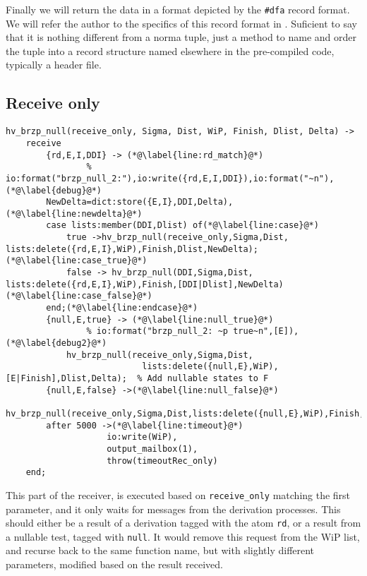 Finally we will return the data in a format depicted by the
\texttt{\#dfa} record format. We will refer the author to the specifics
of this record format in \cite{joe:09}. Suficient to say that it is
nothing different from a norma tuple, just a method to name and order
the tuple into a record structure named elsewhere in the pre-compiled
code, typically a header file.

\subsection{Receive only}
\label{sec:receive}

\begin{lstlisting}[name=hvp2]
%Receive only, nothing to derive
hv_brzp_null(receive_only, Sigma, Dist, WiP, Finish, Dlist, Delta) ->
	receive
		{rd,E,I,DDI} -> (*@\label{line:rd_match}@*)
                % io:format("brzp_null_2:"),io:write({rd,E,I,DDI}),io:format("~n"),(*@\label{debug}@*)
		NewDelta=dict:store({E,I},DDI,Delta),(*@\label{line:newdelta}@*)
		case lists:member(DDI,Dlist) of(*@\label{line:case}@*)
			true ->hv_brzp_null(receive_only,Sigma,Dist, lists:delete({rd,E,I},WiP),Finish,Dlist,NewDelta);(*@\label{line:case_true}@*)
			false -> hv_brzp_null(DDI,Sigma,Dist, lists:delete({rd,E,I},WiP),Finish,[DDI|Dlist],NewDelta)(*@\label{line:case_false}@*)
		end;(*@\label{line:endcase}@*)
		{null,E,true} -> (*@\label{line:null_true}@*)
                % io:format("brzp_null_2: ~p true~n",[E]), (*@\label{debug2}@*)
			hv_brzp_null(receive_only,Sigma,Dist,
                           lists:delete({null,E},WiP),[E|Finish],Dlist,Delta);	% Add nullable states to F
		{null,E,false} ->(*@\label{line:null_false}@*)
			hv_brzp_null(receive_only,Sigma,Dist,lists:delete({null,E},WiP),Finish,Dlist,Delta)
		after 5000 ->(*@\label{line:timeout}@*)
                    io:write(WiP),
                    output_mailbox(1),
                    throw(timeoutRec_only)
	end;
\end{lstlisting}

This part of the receiver, is executed based on \texttt{receive\_only}
matching the first parameter, and it only waits for messages from the
derivation processes. This should either be a result of a derivation
tagged with the atom \texttt{rd}, or a result from a nullable test,
tagged with \texttt{null}. It would remove this request from the WiP
list, and recurse back to the same function name, but with slightly
different parameters, modified based on the result received. 

